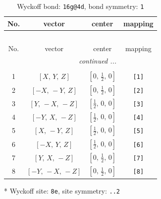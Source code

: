 \documentclass[fleqn,8pt]{jsarticle}
\begin{document}
\begin{longtable}{cccc}
\caption{Wyckoff bond: {\tt 16g@4d}, bond symmetry: {\tt 1}}
 \\
 \hline \hline
No. & vector & center & mapping \\ \hline \endfirsthead

\multicolumn{3}{l}{\tablename\ \thetable{}} \\
 \hline \hline
No. & vector & center & mapping \\ \hline \endhead

 \hline \hline
\multicolumn{3}{r}{\footnotesize\it continued ...} \\ \endfoot

 \hline \hline
\multicolumn{3}{r}{} \\ \endlastfoot

1 & $\left[ X,\, Y,\, Z \right]$ & $\left[ 0,\, \frac{1}{2},\, 0 \right]$ & {\tt [1]} \\ \hline
2 & $\left[ - X,\, - Y,\, Z \right]$ & $\left[ 0,\, \frac{1}{2},\, 0 \right]$ & {\tt [2]} \\ \hline
3 & $\left[ Y,\, - X,\, - Z \right]$ & $\left[ \frac{1}{2},\, 0,\, 0 \right]$ & {\tt [3]} \\ \hline
4 & $\left[ - Y,\, X,\, - Z \right]$ & $\left[ \frac{1}{2},\, 0,\, 0 \right]$ & {\tt [4]} \\ \hline
5 & $\left[ X,\, - Y,\, Z \right]$ & $\left[ \frac{1}{2},\, 0,\, 0 \right]$ & {\tt [5]} \\ \hline
6 & $\left[ - X,\, Y,\, Z \right]$ & $\left[ \frac{1}{2},\, 0,\, 0 \right]$ & {\tt [6]} \\ \hline
7 & $\left[ Y,\, X,\, - Z \right]$ & $\left[ 0,\, \frac{1}{2},\, 0 \right]$ & {\tt [7]} \\ \hline
8 & $\left[ - Y,\, - X,\, - Z \right]$ & $\left[ 0,\, \frac{1}{2},\, 0 \right]$ & {\tt [8]} \\
\end{longtable}
* Wyckoff site: {\tt 8e}, site symmetry: {\tt ..2}
\renewcommand{\arraystretch}{1.2}
\end{document}
